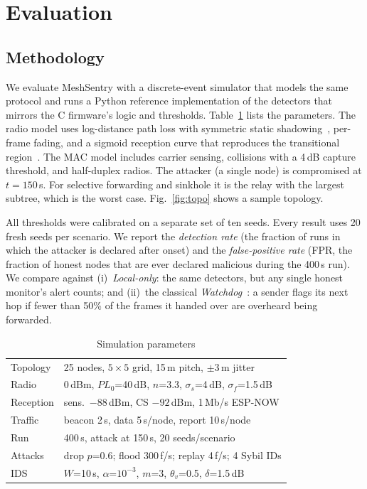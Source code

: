 \documentclass[conference]{IEEEtran}
\begin{document}
\section{Evaluation}
\label{sec:eval}
\subsection{Methodology}
We evaluate MeshSentry with a discrete-event simulator that models the
same protocol and runs a Python reference implementation of the detectors
that mirrors the C firmware's logic and thresholds. Table~\ref{tab:setup} lists the parameters.
The radio model uses log-distance path loss with symmetric static
shadowing~\cite{rappaport2002wireless}, per-frame fading, and a sigmoid
reception curve that reproduces the transitional
region~\cite{zuniga2004transitional}. The MAC model includes carrier sensing,
collisions with a 4\,dB capture threshold, and half-duplex radios. The attacker
(a single node) is compromised at $t=150$\,s. For selective forwarding and
sinkhole it is the relay with the largest subtree, which is the worst case.
Fig.~\ref{fig:topo} shows a sample topology.

All thresholds were calibrated on a separate set of ten seeds. Every result
uses 20 fresh seeds per scenario. We report the \emph{detection rate} (the
fraction of runs in which the attacker is declared after onset) and the
\emph{false-positive rate} (FPR, the fraction of honest nodes that are ever
declared malicious during the 400\,s run). We compare against
(i)~\emph{Local-only}: the same detectors, but any single honest monitor's
alert counts; and (ii)~the classical \emph{Watchdog}~\cite{marti2000watchdog}:
a sender flags its next hop if fewer than 50\% of the frames it handed over
are overheard being forwarded.

\begin{table}[t]
\centering
\caption{Simulation parameters}
\label{tab:setup}
\small
\begin{tabular}{@{}ll@{}}
\toprule
Topology & 25 nodes, $5{\times}5$ grid, 15\,m pitch, $\pm$3\,m jitter \\
Radio & 0\,dBm, $PL_0$=40\,dB, $n$=3.3, $\sigma_s$=4\,dB, $\sigma_f$=1.5\,dB \\
Reception & sens.\ $-88$\,dBm, CS $-92$\,dBm, 1\,Mb/s ESP-NOW \\
Traffic & beacon 2\,s, data 5\,s/node, report 10\,s/node \\
Run & 400\,s, attack at 150\,s, 20 seeds/scenario \\
Attacks & drop $p$=0.6; flood 300\,f/s; replay 4\,f/s; 4 Sybil IDs \\
IDS & $W$=10\,s, $\alpha$=$10^{-3}$, $m$=3, $\theta_v$=0.5, $\delta$=1.5\,dB \\
\bottomrule
\end{tabular}
\end{table}
\end{document}
